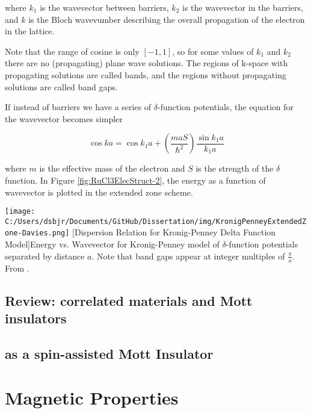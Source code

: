 where $k_{1}$ is the wavevector between barriers, $k_{2}$ is the wavevector in the barriers, and $k$ is the Bloch wavevumber describing the overall propagation of the electron in the lattice.

Note that the range of cosine is only $[-1, 1]$, so for some values of $k_{1}$ and $k_{2}$ there are no (propagating) plane wave solutions. The regions of k-space with propagating solutions are called bands, and the regions without propagating solutions are called band gaps.

If instead of barriers we have a series of $\delta$-function potentials, the equation for the wavevector becomes simpler

\begin{equation}
\cos{k a} = \cos{k_{1} a} + \left( \frac{m a S}{\hbar^{2}} \right) \frac{\sin{k_{1} a}}{k_{1} a}
\end{equation}

where $m$ is the effective mass of the electron and $S$ is the strength of the $\delta$ function. In Figure \ref{fig:RuCl3ElecStruct-2}, the energy as a function of wavevector is plotted in the extended zone scheme.

\begin{centering}
\texttt{[image: C:/Users/dsbjr/Documents/GitHub/Dissertation/img/KronigPenneyExtendedZone-Davies.png]}
  \captionsetup{width=0.75\textwidth}
  [Dispersion Relation for Kronig-Penney Delta Function Model]{Energy vs. Wavevector for Kronig-Penney model of $\delta$-function potentials separated by distance $a$. Note that band gaps appear at integer multiples of $\frac{\pi}{a}$. From \cite{Davies1997}.} 
  \label{fig:RuCl3ElecStruct-2}
\end{centering}



\subsection{Review: correlated materials and Mott insulators}

\subsection{\texorpdfstring{\rucl}{RuCl3}as a spin-assisted Mott Insulator}


\section{Magnetic Properties}

